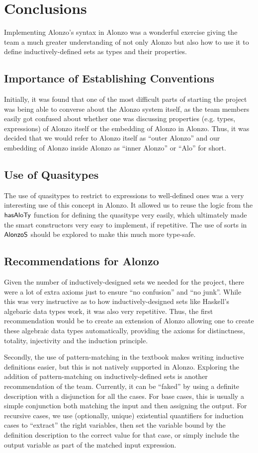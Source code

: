 \documentclass{article}
\begin{document}
\section{Conclusions}
Implementing Alonzo's syntax in Alonzo was a wonderful exercise giving the team a much greater understanding of
not only Alonzo but also how to use it to define inductively-defined sets as types and their properties. 

\subsection{Importance of Establishing Conventions}
Initially,
it was found that one of the most difficult parts of starting the project was being able to converse about the
Alonzo system itself, as the team members easily got confused about whether one was discussing properties (e.g.
types, expressions) of Alonzo itself or the embedding of Alonzo in Alonzo. Thus, it was decided that we would 
refer to Alonzo itself as ``outer Alonzo'' and our embedding of Alonzo inside Alonzo as ``inner Alonzo'' or 
``Alo'' for short.

\subsection{Use of Quasitypes}
The use of quasitypes to restrict to expressions to well-defined ones was a very interesting use of this concept
in Alonzo. It allowed us to reuse the logic from the $\mathsf{hasAloTy}$ function for defining the quasitype very
easily, which ultimately made the smart constructors very easy to implement, if repetitive. The use of sorts in
$\mathsf{AlonzoS}$ should be explored to make this much more type-safe.

\subsection{Recommendations for Alonzo}
Given the number of inductively-designed sets we needed for the project, there were a lot of extra axioms just
to ensure ``no confusion'' and ``no junk''. While this was very instructive as to how inductively-designed sets
like Haskell's algebaric data types work, it was also very repetitive. Thus, the first recommendation would be to
create an extension of Alonzo allowing one to create these algebraic data types automatically, providing the
axioms for distinctness, totality, injectivity and the induction principle.

Secondly, the use of pattern-matching in the textbook makes writing inductive definitions easier, but this is
not natively supported in Alonzo. Exploring the addition of pattern-matching on inductively-defined sets is
another recommendation of the team. Currently, it can be ``faked'' by using a definite description with a 
disjunction for all the cases. For base cases, this is usually a simple conjunction both matching the input and 
then assigning the output. For recursive cases, we use (optionally, unique) existential quantifiers for 
induction cases to ``extract'' the right variables, then set the variable
bound by the definition description to the correct value for that case, or simply include the output variable
as part of the matched input expression.
\end{document}

